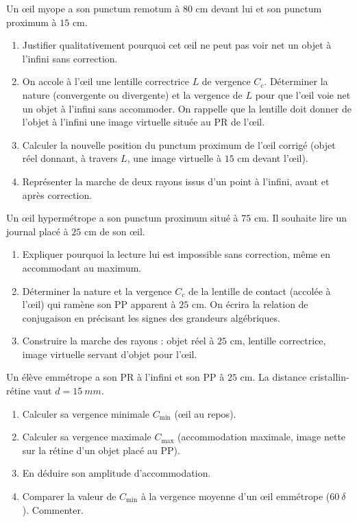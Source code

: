 \documentclass[11pt]{article}
\newcounter{popsec}
\newcounter{popsub}
\newcommand{\courssub}[1]{%
  \stepcounter{popsub}%
  \par\vspace{9pt}\noindent{\popxbold\fontsize{11.5}{13}\selectfont\color{popink}{\color{poporange}\thepopsec.\thepopsub}\hspace{6pt}#1}\par\nopagebreak\vspace{4pt}
}
\begin{document}
\courssub{Je m'entraîne}

\begin{exercice}
Un œil myope a son punctum remotum à $80$ cm devant lui et son punctum proximum à $15$ cm.
\begin{enumerate}
\item Justifier qualitativement pourquoi cet œil ne peut pas voir net un objet à l'infini sans correction.
\item On accole à l'œil une lentille correctrice $L$ de vergence $C_c$. Déterminer la nature (convergente ou divergente) et la vergence de $L$ pour que l'œil voie net un objet à l'infini sans accommoder. On rappelle que la lentille doit donner de l'objet à l'infini une image virtuelle située au PR de l'œil.
\item Calculer la nouvelle position du punctum proximum de l'œil corrigé (objet réel donnant, à travers $L$, une image virtuelle à $15$ cm devant l'œil).
\item Représenter la marche de deux rayons issus d'un point à l'infini, avant et après correction.
\end{enumerate}
\end{exercice}

\begin{exercice}
Un œil hypermétrope a son punctum proximum situé à $75$ cm. Il souhaite lire un journal placé à $25$ cm de son œil.
\begin{enumerate}
\item Expliquer pourquoi la lecture lui est impossible sans correction, même en accommodant au maximum.
\item Déterminer la nature et la vergence $C_c$ de la lentille de contact (accolée à l'œil) qui ramène son PP apparent à $25$ cm. On écrira la relation de conjugaison en précisant les signes des grandeurs algébriques.
\item Construire la marche des rayons : objet réel à $25$ cm, lentille correctrice, image virtuelle servant d'objet pour l'œil.
\end{enumerate}
\end{exercice}

\begin{exercice}
Un élève emmétrope a son PR à l'infini et son PP à $25$ cm. La distance cristallin-rétine vaut $d = \SI{15}{mm}$.
\begin{enumerate}
\item Calculer sa vergence minimale $C_{\min}$ (œil au repos).
\item Calculer sa vergence maximale $C_{\max}$ (accommodation maximale, image nette sur la rétine d'un objet placé au PP).
\item En déduire son amplitude d'accommodation.
\item Comparer la valeur de $C_{\min}$ à la vergence moyenne d'un œil emmétrope ($60\ \delta$). Commenter.
\end{enumerate}
\end{exercice}
\end{document}
